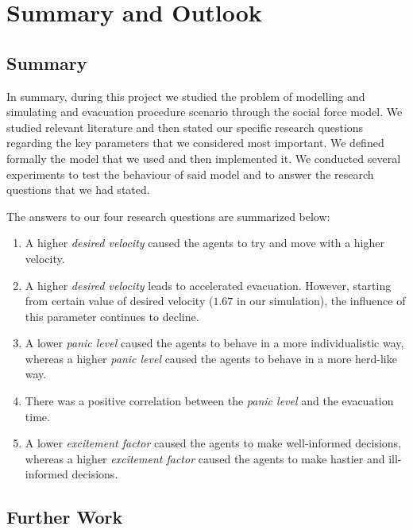 \section{Summary and Outlook} \label{sec:7-summary}
\subsection{Summary}
In summary, during this project we studied the problem of modelling and simulating and evacuation procedure scenario through the social force model. We studied relevant literature and then stated our specific research questions regarding the key parameters that we considered most important. We defined formally the model that we used and then implemented it. We conducted several experiments to test the behaviour of said model and to answer the research questions that we had stated.

The answers to our four research questions are summarized below:
\begin{enumerate}
	\item A higher \emph{desired velocity} caused the agents to try and move with a higher velocity.
	
	\item A higher \emph{desired velocity} leads to accelerated evacuation. However, starting from certain value of desired velocity ($1.67$ in our simulation), the influence of this parameter continues to decline.
	
	\item A lower \emph{panic level} caused the agents to behave in a more individualistic way, whereas a higher \emph{panic level} caused the agents to behave in a more herd-like way.
	
	\item There was a positive correlation between the \emph{panic level} and the evacuation time.
	
	\item A lower \emph{excitement factor} caused the agents to make well-informed decisions, whereas a higher \emph{excitement factor} caused the agents to make hastier and ill-informed decisions.
\end{enumerate}

\subsection{Further Work}